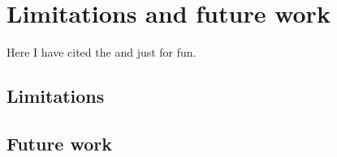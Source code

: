\documentclass[../report.tex]{subfiles}
\begin{document}
	
	\chapter{Limitations and future work}
	
	Here I have cited the \cite{adxl} and \cite{kiburz1986bicycle} just for fun.\\
	
	\section{Limitations}
	
	\section{Future work}
	
\end{document}
